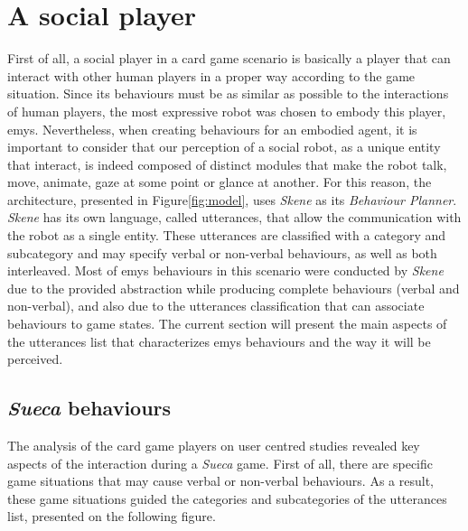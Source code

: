\section{A social player}
\label{sec:social_player}

First of all, a social player in a card game scenario is basically a player that can interact with other human players in a proper way according to the game situation.
Since its behaviours must be as similar as possible to the interactions of human players, the most expressive robot was chosen to embody this player, \ac{emys}.
Nevertheless, when creating behaviours for an embodied agent, it is important to consider that our perception of a social robot, as a unique entity that interact, is indeed composed of distinct modules that make the robot talk, move, animate, gaze at some point or glance at another.
For this reason, the architecture, presented in Figure\ref{fig:model}, uses \emph{Skene} as its \emph{Behaviour Planner}.
\emph{Skene} has its own language, called utterances, that allow the communication with the robot as a single entity.
These utterances are classified with a category and subcategory and may specify verbal or non-verbal behaviours, as well as both interleaved.
Most of \ac{emys} behaviours in this scenario were conducted by \emph{Skene} due to the provided abstraction while producing complete behaviours (verbal and non-verbal), and also due to the utterances classification that can associate behaviours to game states.
The current section will present the main aspects of the utterances list that characterizes \ac{emys} behaviours and the way it will be perceived.



\subsection{\emph{Sueca} behaviours}
The analysis of the card game players on user centred studies revealed key aspects of the interaction during a \emph{Sueca} game.
First of all, there are specific game situations that may cause verbal or non-verbal behaviours.
As a result, these game situations guided the categories and subcategories of the utterances list, presented on the following figure.

